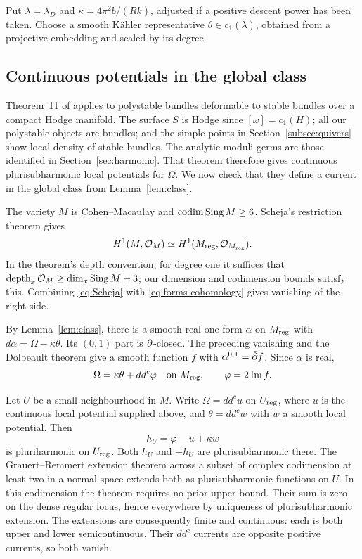 Put $\lambda=\lambda_D$ and
$\kappa=4\pi^2b/(Rk)$, adjusted if a positive descent
power has been taken. Choose a smooth K\"ahler
representative $\theta\in c_1(\lambda)$, obtained from
a projective embedding and scaled by its degree.

\subsection{Continuous potentials in the global class}
Theorem~11 of \cite{buchdahl21} applies to polystable
bundles deformable to stable bundles over a compact Hodge
manifold. The surface $S$ is Hodge since $[\omega]=c_1(H)$;
all our polystable objects are bundles; and the simple
points in Section~\ref{subsec:quivers} show local density
of stable bundles. The analytic moduli germs are those
identified in Section~\ref{sec:harmonic}. That theorem
therefore gives continuous plurisubharmonic local
potentials for $\Omega$. We now check that they define
a current in the global class from Lemma~\ref{lem:class}.

The variety $M$ is Cohen--Macaulay and
$\operatorname{codim}\operatorname{Sing} M\ge6$. Scheja's restriction
theorem \cite[Section~5, Corollary after Satz~III]{scheja61}
gives
\begin{equation}\label{eq:Scheja}
 H^1(M,\mathcal O_M)\simeq H^1(M_{\mathrm{reg}},\mathcal O_{M_{\mathrm{reg}}}).
\end{equation}
In the theorem's depth convention, for degree one it
suffices that
$\operatorname{depth}_x\mathcal O_M\ge\dim_x\operatorname{Sing} M+3$;
our dimension and codimension bounds satisfy this.
Combining \eqref{eq:Scheja} with
\eqref{eq:forms-cohomology} gives vanishing of the
right side.

By Lemma~\ref{lem:class}, there is a smooth real
one-form $\alpha$ on $M_{\mathrm{reg}}$ with
$d\alpha=\Omega-\kappa\theta$. Its $(0,1)$ part is
$\bar\partial$-closed. The preceding vanishing and the
Dolbeault theorem give a smooth function $f$ with
$\alpha^{0,1}=\bar\partial f$. Since $\alpha$ is real,
\begin{equation}\label{eq:global-potential}
 \Omega=\kappa\theta+dd^c\varphi
 \quad\hbox{on }M_{\mathrm{reg}},\qquad
 \varphi=2\operatorname{Im}f.
\end{equation}

Let $U$ be a small neighbourhood in $M$. Write
$\Omega=dd^cu$ on $U_{\mathrm{reg}}$, where $u$ is the
continuous local potential supplied above, and
$\theta=dd^cw$ with $w$ a smooth local potential.
Then
\[
 h_U=\varphi-u+\kappa w
\]
is pluriharmonic on $U_{\mathrm{reg}}$. Both $h_U$ and
$-h_U$ are plurisubharmonic there. The
Grauert--Remmert extension theorem across a subset of
complex codimension at least two in a normal space
\cite[Section~1.7, Satz~4]{gr56} extends both as
plurisubharmonic functions on $U$. In this codimension
the theorem requires no prior upper bound. Their sum
is zero on the dense regular locus, hence everywhere
by uniqueness of plurisubharmonic extension. The
extensions are consequently finite and continuous:
each is both upper and lower semicontinuous. Their
$dd^c$ currents are opposite positive currents, so
both vanish.

